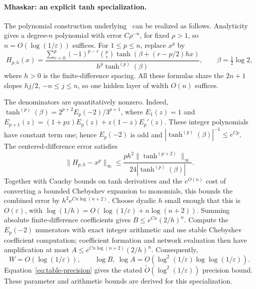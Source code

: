 \paragraph{Mhaskar: an explicit tanh specialization.}
The polynomial construction underlying~\cite{mhaskar1996approximation}
can be realized as follows. Analyticity gives a degree-$n$ polynomial
with error $C\rho^{-n}$, for fixed $\rho>1$, so
$n=O(\log(1/\varepsilon))$ suffices. For $1\le p\le n$, replace $x^p$ by
\[
 H_{p,h}(x)=
 \frac{\sum_{r=0}^{p}(-1)^{p-r}\binom pr
 \tanh\!\left(\beta+(r-p/2)hx\right)}
 {h^p\tanh^{(p)}(\beta)},\qquad \beta=\tfrac12\log2,
\]
where $h>0$ is the finite-difference spacing. All these formulas share
the $2n+1$ slopes $hj/2$, $-n\le j\le n$, so one hidden layer of
width $O(n)$ suffices.

The denominators are quantitatively nonzero. Indeed,
$\tanh^{(p)}(\beta)=2^{p+2}E_p(-2)/3^{p+1}$, where
$E_1(z)=1$ and
$E_{p+1}(z)=(1+pz)E_p(z)+z(1-z)E_p'(z)$.
These integer polynomials have constant term one; hence $E_p(-2)$
is odd and $|\tanh^{(p)}(\beta)|^{-1}\le e^{Cp}$.
The centered-difference error satisfies
\[
 \|H_{p,h}-x^p\|_\infty
 \le \frac{ph^2\|\tanh^{(p+2)}\|_\infty}
 {24|\tanh^{(p)}(\beta)|}.
\]
Together with Cauchy bounds on tanh derivatives and the
$e^{O(n)}$ cost of converting a bounded Chebyshev expansion to monomials,
this bounds the combined error by $h^2e^{Cn\log(n+2)}$.
Choose dyadic $h$ small enough that this is $O(\varepsilon)$, with
$\log(1/h)=O(\log(1/\varepsilon)+n\log(n+2))$.
Summing absolute finite-difference coefficients gives
$B\le e^{Cn}(2/h)^n$.
Compute the $E_p(-2)$ numerators with exact integer arithmetic and use
stable Chebyshev coefficient computation; coefficient formation and
network evaluation then have amplification at most
$A\le e^{Cn\log(n+2)}(2/h)^n$.
Consequently,
\[
 W=O(\log(1/\varepsilon)),\qquad
 \log B,\ \log A
 =O\!\left(\log^2(1/\varepsilon)\log\log(1/\varepsilon)\right).
\]
Equation~\eqref{eq:table-precision} gives the stated
$\widetilde O(\log^2(1/\varepsilon))$ precision bound.
These parameter and arithmetic bounds are derived for this specialization.

